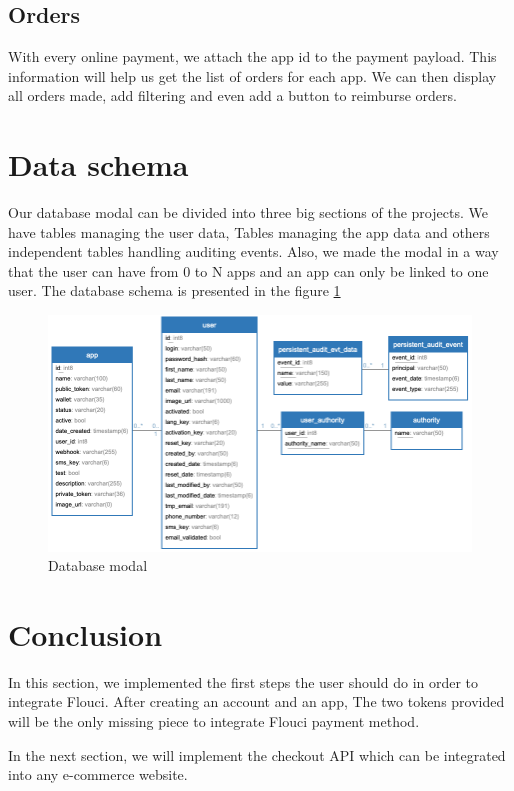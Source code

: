 \begin{spacing}{1.2}
\subsection{Orders}
With every online payment, we attach the app id to the payment payload. This information will help us get the list of orders for each app.
We can then display all orders made, add filtering and even add a button to reimburse orders.

\section{Data schema}
Our database modal can be divided into three big sections of the projects. We have tables managing the user data, Tables managing the app data and others independent tables handling auditing events. Also, we made the modal in a way that the user can have from 0 to N apps and an app can only be linked to one user.
The database schema is presented in the figure \ref{fig:database}
\begin{figure}[H]\centering
\includegraphics[scale=0.6]{db.png}
\caption{Database modal}
\label{fig:database}
\end{figure}

\section*{Conclusion}
In this section, we implemented the first steps the user should do in order to integrate Flouci. After creating an account and an app, The two tokens provided will be the only missing piece to integrate Flouci payment method.

In the next section, we will implement the checkout API which can be integrated into any e-commerce website.
\end{spacing}
